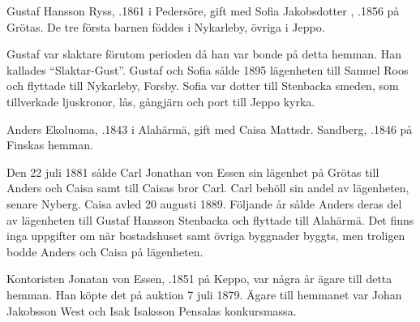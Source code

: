 Gustaf Hansson Ryss, .1861 i Pedersöre, gift med Sofia Jakobsdotter , .1856 på Grötas. De tre första barnen föddes i Nykarleby, övriga i Jeppo.
\begin{jhchildren}
  \item {}
  \item {}
  \item {}
  \item {}
  \item {}
  \item {}
  \item {}
\end{jhchildren}
Gustaf var slaktare förutom perioden då han var bonde på detta hemman. Han kallades ``Slaktar-Gust''. Gustaf och Sofia sålde 1895 lägenheten till Samuel Roos och flyttade till Nykarleby, Forsby. Sofia var dotter till Stenbacka smeden, som tillverkade ljuskronor, lås, gångjärn och port till Jeppo kyrka.


Anders Ekoluoma, .1843 i Alahärmä, gift med Caisa Mattsdr. Sandberg, .1846 på Finskas hemman.
\begin{jhchildren}
  \item {}
  \item {}
  \item {}
  \item {}
\end{jhchildren}
Den 22 juli 1881 sålde Carl Jonathan von Essen sin lägenhet på Grötas till Anders och Caisa samt till Caisas bror Carl. Carl behöll sin andel av lägenheten, senare Nyberg. Caisa avled 20 augusti 1889. Följande år sålde Anders deras del av lägenheten till Gustaf Hansson Stenbacka och flyttade till Alahärmä. Det finns inga uppgifter om när bostadshuset samt övriga byggnader byggts, men troligen bodde Anders och Caisa på lägenheten.


Kontoristen Jonatan von Essen, .1851 på Keppo, var några år ägare till detta hemman. Han köpte det på auktion 7 juli 1879. Ägare till hemmanet var Johan Jakobsson West och Isak Isaksson Pensalas konkursmassa.



